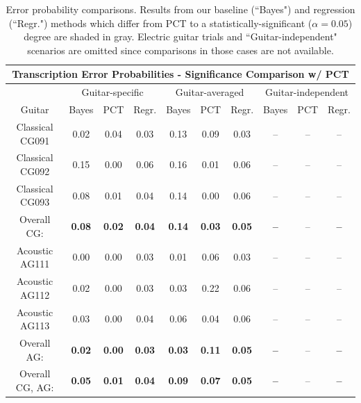 \documentclass[12pt]{cmuthesis}
\begin{document}
\begin{table}[!htbp]
\begin{center}
\begin{tabular} {||c||c|c|c||c|c|c||c|c|c||}
\hline
\multicolumn{10}{||c||}{\bf{Transcription Error Probabilities - Significance Comparison w/ PCT}} \\
\hline
 & \multicolumn{3}{|c||}{Guitar-specific} & \multicolumn{3}{|c||}{Guitar-averaged}& \multicolumn{3}{|c||}{Guitar-independent}\\
\hline
Guitar & Bayes & PCT & Regr. & Bayes & PCT & Regr. & Bayes & PCT & Regr.\\
\hline
\hline
Classical CG091 &  \cellcolor[gray]{0.8}0.02 & 0.04 & 0.03 &  \cellcolor[gray]{0.8}0.13 & 0.09 &  \cellcolor[gray]{0.8}0.03 & -- & -- & -- \\
\hline
Classical CG092 &  \cellcolor[gray]{0.8}0.15 & 0.00 &  \cellcolor[gray]{0.8}0.06 &  \cellcolor[gray]{0.8}0.16 & 0.01 &  \cellcolor[gray]{0.8}0.06 & -- & -- & -- \\
\hline
Classical CG093 &  \cellcolor[gray]{0.8}0.08 & 0.01 &  \cellcolor[gray]{0.8}0.04 & \cellcolor[gray]{0.8}0.14 & 0.00 &  \cellcolor[gray]{0.8}0.06 & -- & -- & -- \\
\hline
Overall CG: &  \cellcolor[gray]{0.8}\bf{0.08} & \bf{0.02}  &  \cellcolor[gray]{0.8}\bf{0.04} &  \cellcolor[gray]{0.8}\bf{0.14} & \bf{0.03} &  \cellcolor[gray]{0.8}\bf{0.05} & \bf{--} & -- & \bf{--}\\
\hline
\hline
Acoustic AG111 & 0.00 & 0.00 &  \cellcolor[gray]{0.8}0.03 &  \cellcolor[gray]{0.8}0.01 & 0.06 &  \cellcolor[gray]{0.8}0.03 & -- & -- & -- \\
\hline
Acoustic AG112 &  \cellcolor[gray]{0.8}0.02 & 0.00 &  \cellcolor[gray]{0.8}0.03 &  \cellcolor[gray]{0.8}0.03 & 0.22 &  \cellcolor[gray]{0.8}0.06 & -- & -- & -- \\
\hline
Acoustic AG113  &  \cellcolor[gray]{0.8}0.03 & 0.00 &  \cellcolor[gray]{0.8}0.04 &  \cellcolor[gray]{0.8}0.06 & 0.04 &  \cellcolor[gray]{0.8}0.06 & -- & -- & --\\
\hline
Overall AG: &  \cellcolor[gray]{0.8}\bf{0.02} & \bf{0.00} &  \cellcolor[gray]{0.8}\bf{0.03} &  \cellcolor[gray]{0.8}\bf{0.03} & \bf{0.11} &  \cellcolor[gray]{0.8}\bf{0.05} & \bf{--} & -- & \bf{--}\\
\hline
\hline
\hline
Overall CG, AG: &   \cellcolor[gray]{0.8}\bf{0.05} & \bf{0.01} &   \cellcolor[gray]{0.8}\bf{0.04} &  \cellcolor[gray]{0.8}\bf{0.09} & \bf{0.07} &  \cellcolor[gray]{0.8}\bf{0.05} & \bf{--} & -- & \bf{--}\\
\hline
\hline
\end{tabular}
\caption{Error probability comparisons. Results from our baseline (``Bayes") and regression (``Regr.") methods which differ from PCT to a statistically-significant ($\alpha=0.05$) degree are shaded in gray. Electric guitar trials and ``Guitar-independent" scenarios are omitted since comparisons in those cases are not available.}
\label{tab:ttest-RWC}
\end{center}
\end{table}
\end{document}
